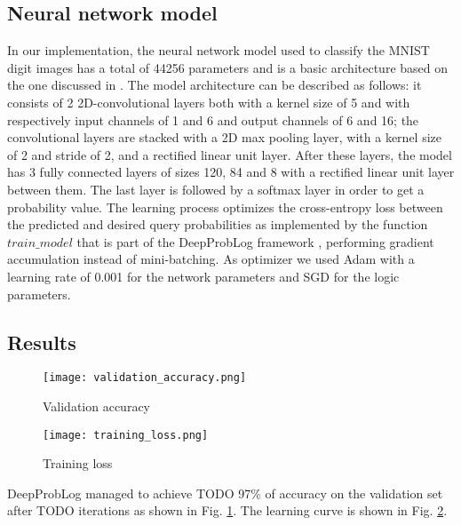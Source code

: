 \subsection{Neural network model}
In our implementation, the neural network model used to classify the MNIST digit images has a total of 44256 parameters and is a basic architecture based on the one discussed in \cite{DeepProbLog}. The model architecture can be described as follows: it consists of 2 2D-convolutional layers both with a kernel size of 5 and with respectively input channels of 1 and 6 and output channels of 6 and 16; the convolutional layers are stacked with a 2D max pooling layer, with a kernel size of 2 and stride of 2, and a rectified linear unit layer.
After these layers, the model has 3 fully connected layers of sizes 120, 84 and 8 with a rectified linear unit layer between them. The last layer is followed by a softmax layer in order to get a probability value.
The learning process optimizes the cross-entropy loss between the predicted and desired query probabilities as implemented by the function $train\_model$ that is part of the DeepProbLog framework \cite{TODO}, performing gradient accumulation instead of mini-batching.
As optimizer we used Adam with a learning rate of 0.001 for the network parameters and SGD for the logic parameters.



\subsection{Results}





\begin{figure*}[t]
    \centering
    \begin{subfigure}[b]{0.45\textwidth}
        \centerline{\texttt{[image: validation\_accuracy.png]}}
        \caption{Validation accuracy}
        \label{fig:acc}
    \end{subfigure}
    \hfill
    \begin{subfigure}[b]{0.45\textwidth}
        \centerline{\texttt{[image: training\_loss.png]}}
        \caption{Training loss}
        \label{fig:loss}
    \end{subfigure}
       \caption{Multi-digit MNIST octal-division task learning curves: accuracy on the multi-digit test set on the left \ref{fig:acc}, training loss on the single-digit training set on the right \ref{fig:loss}.}
       \label{fig:training_curves}
\end{figure*}

DeepProbLog managed to achieve TODO 97\% of accuracy on the validation set after TODO iterations as shown in Fig. \ref{fig:acc}. The learning curve is shown in Fig. \ref{fig:loss}.